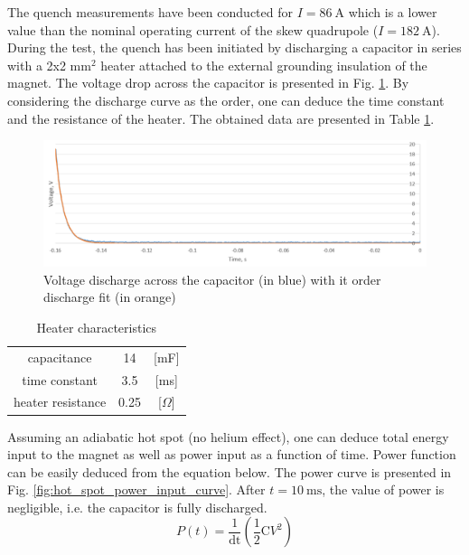 
The quench measurements have been conducted for $I=86~\text{A}$ which is a lower value than the nominal operating current of the skew quadrupole ($I=182~\text{A}$). During the test, the quench has been initiated by discharging a capacitor in series with a 2x2 $\text{mm}^2$ heater attached to the external grounding insulation of the magnet. The voltage drop across the capacitor is presented in Fig. \ref{fig:resistor_voltage_discharge_curve}. By considering the discharge curve as the  order, one can deduce the time constant and the resistance of the heater. The obtained data are presented in Table \ref{table:heater_characteristics}.

\begin{figure}[ht!]
    \centering
    \includegraphics[width=0.65\linewidth]{figures/skew_quad_bcs/voltage_discharge_curve.png}
    \caption{Voltage discharge across the capacitor (in blue) with it  order discharge fit (in orange)}
    \label{fig:resistor_voltage_discharge_curve}
\end{figure}

\begin{table}[h!]
    \caption{Heater characteristics} 
    \vspace{-1.em} 
    \fontsize{10}{10}
    \selectfont 
    \renewcommand{\arraystretch}{1.5}
    \begin{center}
    \begin{tabular}{ ccc }  
    \hline
    capacitance & 14 & [mF] \\
    time constant & 3.5 & [ms] \\
    heater resistance & 0.25 & [$\Omega$] \\
    \hline 
    \end{tabular}
    \end{center}  
     \label{table:heater_characteristics} 
 \end{table}

Assuming an adiabatic hot spot (no helium effect), one can deduce total energy input to the magnet as well as power input as a function of time. Power function can be easily deduced from the equation below. The power curve is presented in Fig. \ref{fig:hot_spot_power_input_curve}. After $t=10~\text{ms}$, the value of power is negligible, i.e. the capacitor is fully discharged.
\begin{equation}
    P(t) = \frac{1}{\text{dt}} (\frac{1}{2} \text{C}V^2)
\end{equation}

